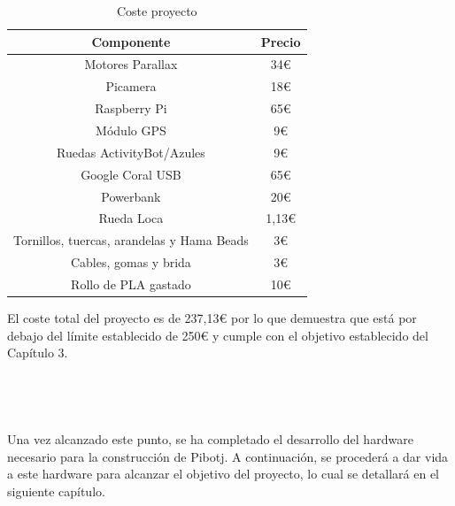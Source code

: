 \begin{table}[H]
	\begin{center}
		\begin{tabular}{|c|c|}
			\hline
			Componente & Precio \\
			\hline
			Motores Parallax & 34€ \\
			\hline
			Picamera &  18€ \\
			\hline
			Raspberry Pi & 65€ \\
			\hline
			Módulo GPS & 9€ \\
			\hline
			Ruedas ActivityBot/Azules & 9€ \\
			\hline
			Google Coral USB & 65€ \\
			\hline
			Powerbank & 20€ \\
			\hline
			Rueda Loca & 1,13€ \\
			\hline
			Tornillos, tuercas, arandelas y Hama Beads & 3€ \\
			\hline
			Cables, gomas y brida & 3€ \\
			\hline
			Rollo de PLA gastado & 10€ \\
			\hline
		\end{tabular}
		\caption{Coste proyecto}
		\label{cuadro:costetotal}
	\end{center}
\end{table}

El coste total del proyecto es de 237,13€ por lo que demuestra que está por debajo del límite establecido de 250€ y cumple con el objetivo establecido del Capítulo 3.\\\\\\\\\\


Una vez alcanzado este punto, se ha completado el desarrollo del hardware necesario para la construcción de Pibotj. A continuación, se procederá a dar vida a este hardware para alcanzar el objetivo del proyecto, lo cual se detallará en el siguiente capítulo.


